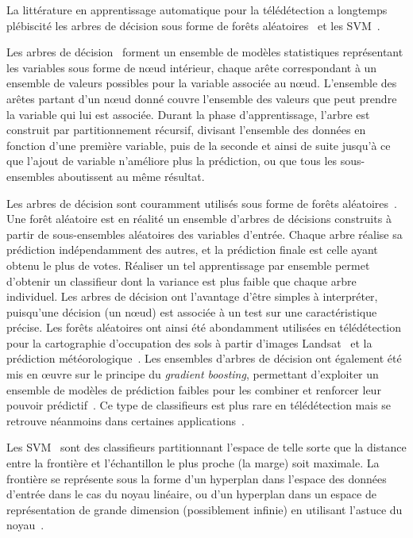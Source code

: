 La littérature en apprentissage automatique pour la télédétection a longtemps plébiscité les arbres de décision sous forme de forêts aléatoires~\cite{breiman_random_2001} et les \gls{SVM}~\cite{boser_training_1992,cortes_support-vector_1995}.

Les arbres de décision~\cite{breiman_classification_2017} forment un ensemble de modèles statistiques représentant les variables sous forme de n\oe{}ud intérieur, chaque arête correspondant à un ensemble de valeurs possibles pour la variable associée au n\oe{}ud. L'ensemble des arêtes partant d'un n\oe{}ud donné couvre l'ensemble des valeurs que peut prendre la variable qui lui est associée. Durant la phase d'apprentissage, l'arbre est construit par partitionnement récursif, divisant l'ensemble des données en fonction d'une première variable, puis de la seconde et ainsi de suite jusqu'à ce que l'ajout de variable n'améliore plus la prédiction, ou que tous les sous-ensembles aboutissent au même résultat.

Les arbres de décision sont couramment utilisés sous forme de forêts aléatoires~\cite{breiman_random_2001}. Une forêt aléatoire est en réalité un ensemble d'arbres de décisions construits à partir de sous-ensembles aléatoires des variables d'entrée. Chaque arbre réalise sa prédiction indépendamment des autres, et la prédiction finale est celle ayant obtenu le plus de votes. Réaliser un tel apprentissage par ensemble permet d'obtenir un classifieur dont la variance est plus faible que chaque arbre individuel. Les arbres de décision ont l'avantage d'être simples à interpréter, puisqu'une décision (un n\oe{}ud) est associée à un test sur une caractéristique précise. Les forêts aléatoires ont ainsi été abondamment utilisées en télédétection pour la cartographie d'occupation des sols à partir d'images \gls{Landsat}~\cite{pal_random_2005} et la prédiction météorologique~\cite{lary_machine_2016}. Les ensembles d'arbres de décision ont également été mis en \oe{}uvre sur le principe du \emph{gradient boosting}, permettant d'exploiter un ensemble de modèles de prédiction faibles pour les combiner et renforcer leur pouvoir prédictif~\cite{friedman_greedy_2001}. Ce type de classifieurs est plus rare en télédétection mais se retrouve néanmoins dans certaines applications~\cite{lawrence_classification_2004}.

Les \gls{SVM}~\cite{boser_training_1992,cortes_support-vector_1995} sont des classifieurs partitionnant l'espace de telle sorte que la distance entre la frontière et l'échantillon le plus proche (la marge) soit maximale. La frontière se représente sous la forme d'un hyperplan dans l'espace des données d'entrée dans le cas du noyau linéaire, ou d'un hyperplan dans un espace de représentation de grande dimension (possiblement infinie) en utilisant l'astuce du noyau~\cite{boser_training_1992}.

